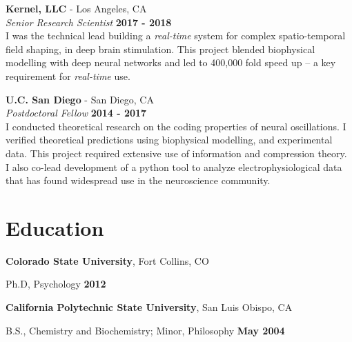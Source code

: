 \documentclass[margin,line]{res}
\newenvironment{list1}{
    \begin{list}{\ding{113}}{%
        \setlength{\itemsep}{0in}
        \setlength{\parsep}{0in} \setlength{\parskip}{0in}
        \setlength{\topsep}{0in} \setlength{\partopsep}{0in}
        \setlength{\leftmargin}{0.17in}}}{
    \end{list}}
\begin{document}
\begin{resume}
\vspace{-.2cm}
{\bf Kernel, LLC} - Los Angeles, CA\\
{\em Senior Research Scientist} \hfill {\bf 2017 - 2018}\\
I was the technical lead building a \emph{real-time} system for complex spatio-temporal field shaping, in deep brain stimulation. This project blended biophysical modelling with deep neural networks and led to 400,000 fold speed up -- a key requirement for \emph{real-time} use.

\vspace{-.2cm}
{\bf U.C. San Diego} - San Diego, CA\\
{\em Postdoctoral Fellow} \hfill {\bf 2014 - 2017}\\
I conducted theoretical research on the coding properties of neural oscillations. I verified theoretical predictions using biophysical modelling, and experimental data. This project required extensive use of information and compression theory. I also co-lead development of a python tool to analyze electrophysiological data that has found widespread use in the neuroscience community.

\vspace{-.2cm}
\section{\sc Education}
{\bf Colorado State University}, Fort Collins, CO\\
\vspace*{-.15in}
\begin{list1}
    \tightlist
    \item[] Ph.D, Psychology \hfill {\bf 2012}
\end{list1}

\vspace*{-.15in}
{\bf California Polytechnic State University}, San Luis Obispo, CA\\
\vspace*{-.15in}
\begin{list1}
    \tightlist
    \item[] B.S., Chemistry and Biochemistry; Minor, Philosophy \hfill {\bf May 2004}
\end{list1}


\vspace{-.1cm}

\end{resume}
\end{document}
